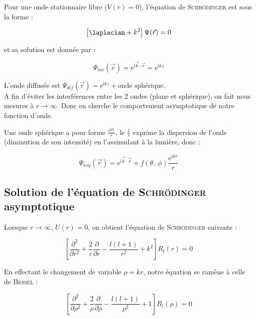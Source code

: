 \documentclass[12pt,a4paper,oneside,french]{book}
\renewcommand{\i}{\mathrm{i}}
\newcommand{\e}{\mathrm{e}}
\theoremstyle{definition}
\theoremstyle{definition}
\theoremstyle{definition}
\theoremstyle{remark}
\theoremstyle{definition}
\begin{document}
    Pour une onde stationnaire libre ($V(r) = 0$), l'équation de \textsc{Schrödinger} est sous la forme :
    
    \begin{equation*}
        \left[\laplacian + {k}^{2}\right] \Psi(\vec{r}) = 0
    \end{equation*}
    
    et sa solution est donnée par :
    
    \begin{equation*}
        {\Psi}_{inc}(\vec{r}) = {\e}^{\i \vec{k} \cdot \vec{r}} = {\e}^{\i k z}
    \end{equation*}
    
    L'onde diffusée est ${\Psi}_{dif}(\vec{r}) = {\e}^{\i k z} + \text{onde sphérique}$. \\
    
    A fin d'éviter les interférences entre les 2 ondes (plane et sphérique), on fait nous mesures à $r \to \infty$. Donc en cherche le comportement asymptotique de notre fonction d'onde.
    
    Une onde sphérique a pour forme $\frac{{\e}^{\i k r}}{r}$, le $\frac{1}{r}$ exprime la dispersion de l'onde (diminution de son intensité) en l'assimulant à la lumière, donc :

    \begin{equation*}
        {\Psi}_{asy}(\vec{r}) = {\e}^{\i \vec{k} \cdot \vec{r}} + f(\theta, \ \phi) \frac{{\e}^{\i k r}}{r}
    \end{equation*}
    
    \subsection{Solution de l'équation de \textsc{Schrödinger} asymptotique}
    Lorsque $r \to \infty$, $U(r) = 0$, on obtient l'équation de \textsc{Schrödinger} suivante :
    
    \begin{equation*}
        \left[\frac{{\partial}^{2}}{\partial {r}^{2}} + \frac{2}{r} \frac{\partial}{\partial r} - \frac{l(l + 1)}{{r}^{2}} + {k}^{2}\right] {R}_{l}(r) = 0
    \end{equation*}
    
    En effectant le changement de variable $\rho = k r$, notre équation se ramène à celle de \textsc{Bessel} :
    
    \begin{equation*}
        \left[\frac{{\partial}^{2}}{\partial {\rho}^{2}} + \frac{2}{\rho} \frac{\partial}{\partial \rho} - \frac{l(l + 1)}{{\rho}^{2}} + 1\right] {R}_{l}(\rho) = 0
    \end{equation*}
    
\end{document}
